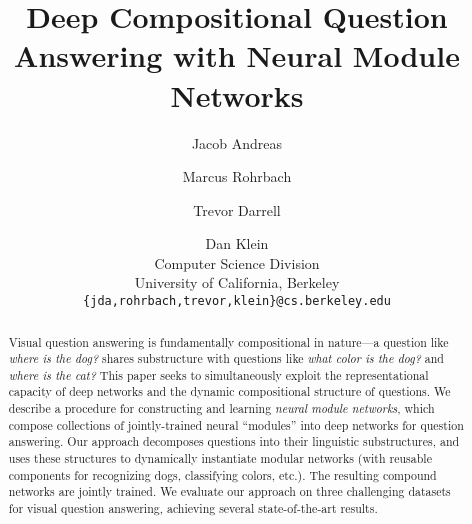 \documentclass[10pt,twocolumn,letterpaper]{article}
\begin{document}
\newcommand{\nmn}{Neural Module Networks\xspace}
\newcommand{\mod}[1]{{\small\texttt{#1}}}
\newcommand{\todo}{\textcolor{red}}
\newcommand{\shapes}{{\textsc{shapes}}\xspace}
\newcommand{\cocoqa}{{\textsc{CocoQA}}\xspace}
\newcommand{\marcus}[1]{\textcolor{blue}{Marcus: #1}}
\title{Deep Compositional Question Answering with Neural Module Networks}

\author{Jacob Andreas \and Marcus Rohrbach \and Trevor Darrell \and Dan Klein \\
Computer Science Division\\
University of California, Berkeley\\
{\tt\small \{jda,rohrbach,trevor,klein\}@cs.berkeley.edu}
}

\maketitle

\begin{abstract}
  Visual question answering is fundamentally compositional in nature---a
  question like \emph{where is the dog?} shares substructure with questions like
  \emph{what color is the dog?} and \emph{where is the cat?} This paper seeks to
  simultaneously exploit the representational capacity of deep networks and the
  dynamic compositional structure of questions.  We describe a procedure for
  constructing and learning \emph{neural module networks}, which compose
  collections of jointly-trained neural ``modules'' into deep networks for
  question answering. Our approach decomposes questions into their linguistic
  substructures, and uses these structures to dynamically instantiate modular
  networks (with reusable components for recognizing dogs, classifying colors,
  etc.). The resulting compound networks are jointly trained. We evaluate our
  approach on three challenging datasets for visual question answering,
  achieving several state-of-the-art results.
\end{abstract}





\end{document}
